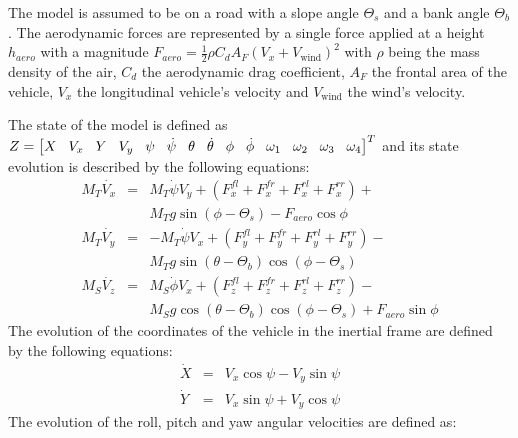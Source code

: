 \documentclass[journal]{IEEEtran}
\begin{document}
The model is assumed to be on a road with a slope angle $\Theta_s$ and a bank angle $\Theta_b$. The aerodynamic forces are represented by a single force applied at a height $h_{aero}$ with a magnitude $F_{aero} = \frac{1}{2}\rho C_dA_F(V_x+V_{\text{wind}})^2$ with $\rho$ being the mass density of the air, $C_d$ the aerodynamic drag coefficient, $A_F$ the frontal area of the vehicle, $V_x$ the longitudinal vehicle's velocity and $V_{\text{wind}}$ the wind's velocity.

The state of the model is defined as 
$
\begingroup
\setlength\arraycolsep{4.25pt}
Z = \left[\begin{matrix}X & V_x & Y & V_y & \psi & \dot\psi & \theta & \dot\theta & \phi  \end{matrix}\begin{matrix}& \dot\phi
&\omega_1 & \omega_2 & \omega_3 & \omega_4\end{matrix}\right]^T
\endgroup
$
and its state evolution is described by the following equations: \begin{subequations}\label{fourWheelTranslation.eq}
\begin{eqnarray}
M_T \dot{V_x} &=& M_T \dot\psi V_y + (F_{x}^{fl}+F_{x}^{fr}+F_{x}^{rl}+F_{x}^{rr}) + \label{4wm1.eq}\\
&& M_Tg\sin(\phi-\Theta_s) - F_{aero}\cos\phi \nonumber\\
M_T \dot{V_y} &=& -M_T \dot\psi V_x + (F_{y}^{fl}+F_{y}^{fr}+F_{y}^{rl}+F_{y}^{rr})- \label{4wm2.eq}\\
&&  M_Tg\sin(\theta-\Theta_b)\cos(\phi-\Theta_s) \nonumber\\
M_S \dot{V_z} &=& M_S \dot\phi V_x + (F_{z}^{fl} + F_{z}^{fr} + F_{z}^{rl} + F_{z}^{rr}) -\\
&& M_Sg\cos(\theta-\Theta_b)\cos(\phi-\Theta_s) + F_{aero}\sin\phi \nonumber
\end{eqnarray}
\end{subequations}
The evolution of the coordinates of the vehicle in the inertial frame are defined by the following equations:
\begin{subequations}\label{xyLink.eq}
\begin{eqnarray}
\dot X &=& V_x\cos\psi-V_y\sin\psi \\
\dot Y &=& V_x\sin\psi+V_y\cos\psi 
\end{eqnarray}\label{inertialConversion.eq}
\end{subequations}
The evolution of the roll, pitch and yaw angular velocities are defined as:
\end{document}
